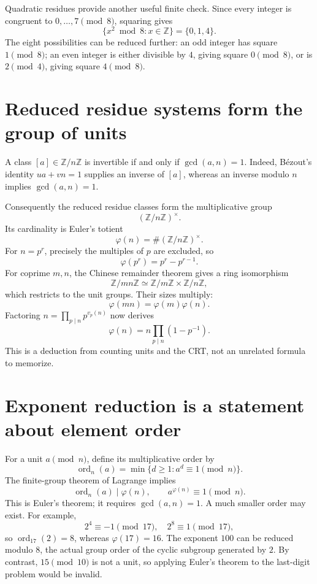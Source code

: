 Quadratic residues provide another useful finite check. Since every integer is congruent to \(0,\ldots,7\pmod8\), squaring gives
\[
 \{x^2\bmod8:x\in\mathbb Z\}=\{0,1,4\}.
\]
The eight possibilities can be reduced further: an odd integer has square \(1\pmod8\); an even integer is either divisible by \(4\), giving square \(0\pmod8\), or is \(2\pmod4\), giving square \(4\pmod8\).

\section{Reduced residue systems form the group of units}

A class \([a]\in\mathbb Z/n\mathbb Z\) is invertible if and only if \(\gcd(a,n)=1\). Indeed, Bézout's identity \(ua+vn=1\) supplies an inverse of \([a]\), whereas an inverse modulo \(n\) implies \(\gcd(a,n)=1\).

Consequently the reduced residue classes form the multiplicative group
\[
 (\mathbb Z/n\mathbb Z)^\times.
\]
Its cardinality is Euler's totient
\[
 \varphi(n)=\#(\mathbb Z/n\mathbb Z)^\times.
\]
For \(n=p^r\), precisely the multiples of \(p\) are excluded, so
\[
 \varphi(p^r)=p^r-p^{r-1}.
\]
For coprime \(m,n\), the Chinese remainder theorem gives a ring isomorphism
\[
 \mathbb Z/mn\mathbb Z\simeq
 \mathbb Z/m\mathbb Z\times\mathbb Z/n\mathbb Z,
\]
which restricts to the unit groups. Their sizes multiply:
\[
 \varphi(mn)=\varphi(m)\varphi(n).
\]
Factoring \(n=\prod_{p\mid n}p^{v_p(n)}\) now derives
\[
 \boxed{\varphi(n)=n\prod_{p\mid n}(1-p^{-1}).}
\]
This is a deduction from counting units and the CRT, not an unrelated formula to memorize.

\section{Exponent reduction is a statement about element order}

For a unit \(a\pmod n\), define its multiplicative order by
\[
 \operatorname{ord}_n(a)=\min\{d\ge1:a^d\equiv1\pmod n\}.
\]
The finite-group theorem of Lagrange implies
\[
 \operatorname{ord}_n(a)\mid\varphi(n),\qquad
 a^{\varphi(n)}\equiv1\pmod n.
\]
This is Euler's theorem; it requires \(\gcd(a,n)=1\). A much smaller order may exist. For example,
\[
 2^4\equiv-1\pmod{17},\quad 2^8\equiv1\pmod{17},
\]
so \(\operatorname{ord}_{17}(2)=8\), whereas \(\varphi(17)=16\). The exponent \(100\) can be reduced modulo \(8\), the actual group order of the cyclic subgroup generated by \(2\). By contrast, \(15\pmod{10}\) is not a unit, so applying Euler's theorem to the last-digit problem would be invalid.

